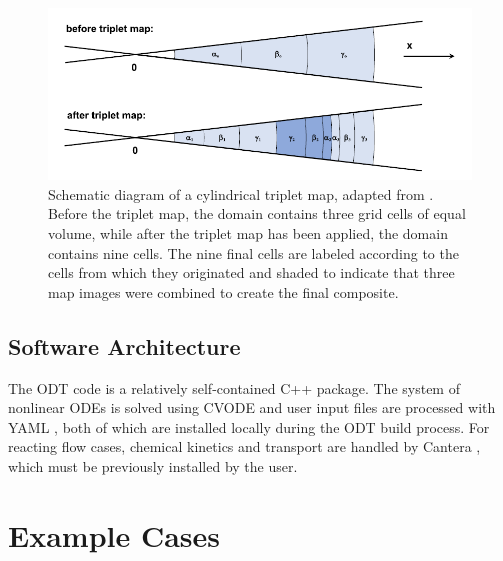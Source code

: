 \documentclass[preprint,12pt, a4paper]{elsarticle}
\begin{document}
\begin{figure}
	\centering
	\includegraphics[width=\textwidth]{../figures/tripletmap/tripletmap.png} 
	\caption{Schematic diagram of a cylindrical triplet map, adapted from \cite{Lignell_2018}. Before the triplet map, the domain contains three grid cells of equal volume, while after the triplet map has been applied, the domain contains nine cells. The nine final cells are labeled according to the cells from which they originated and shaded to indicate that three map images were combined to create the final composite.}
	\label{fig:tripletmap}
\end{figure}

\subsection{Software Architecture}
\label{sub:architecture}

The ODT code is a relatively self-contained C++ package. The system of nonlinear ODEs is solved using CVODE \cite{Hindmarsh_2020} and user input files are processed with YAML \cite{Beder_2008}, both of which are installed locally during the ODT build process. For reacting flow cases, chemical kinetics and transport are handled by Cantera \cite{Goodwin_2018}, which must be previously installed by the user. 


\section{Example Cases}
\label{sec:examples}
\end{document}
